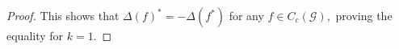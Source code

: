 \documentclass[a4paper,11pt,reqno]{amsart}
\theoremstyle{plain}
\theoremstyle{named}
\numberwithin{equation}{section}
\newcommand{\Bea}{\begin{eqnarray*}}
\newcommand{\Eea}{\end{eqnarray*}}
\begin{document}
\begin{proof}
		This shows that $\Delta (f)^{\ast} = - \Delta (f^{\ast})$ for any $f \in C_c (\mathcal G),$  proving the equality for $k = 1.$ 

\end{proof}
\end{document}
